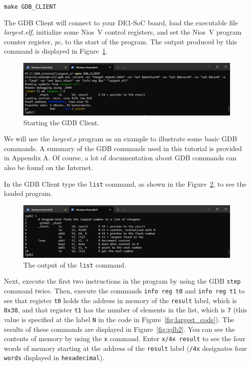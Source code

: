 \documentclass[11pt, twoside, pdftex]{article}
\begin{document}
\texttt{make GDB\_CLIENT}

The GDB Client will connect to your DE1-SoC board, load the executable file {\it largest.elf},
initialize some Nios~V control registers, and set the Nios~V program counter register, {\it pc},
to the start of the program. The output produced by this command is displayed in 
Figure~\ref{fig:gdb_client}.

\begin{figure}[h]
    \begin{center}
        \includegraphics[scale=.6]{figures/gdb_client.png}
        \caption{Starting the GDB Client.}
        \label{fig:gdb_client}
    \end{center}
\end{figure}

We will use the {\it largest.s} program as an example to illustrate some basic GDB commands. 
A summary of the GDB commands used in this tutorial is provided in Appendix A. Of course, a 
lot of documentation about GDB commands can also be found on the Internet. 

In the GDB Client type the \texttt{list} command, as shown in the 
Figure~\ref{fig:gdb1}, to see the loaded program.

\begin{figure}[h]
    \begin{center}
        \includegraphics[scale=.6]{figures/gdb1.png}
        \caption{The output of the \texttt{list} command.}
        \label{fig:gdb1}
    \end{center}
\end{figure}

Next, execute the first two instructions in the program by using the 
GDB \texttt{step} command twice. Then, execute the commands 
\texttt{info reg t0} and \texttt{info reg t1} to see that register \texttt{t0} 
holds the address in memory of the \texttt{result} label, which is \texttt{0x38}, and that
register \texttt{t1} has the number of elements in the list, which is \texttt{7} (this value is
specified at the label \texttt{N} in the code in Figure~\ref{fig:largest_code}).
The results of these commands are displayed in Figure~\ref{fig:gdb2}. You can see the
contents of memory by using the \texttt{x} command. Enter \texttt{x/4x result} to see the
four words of memory starting at the address of the \texttt{result} label (\texttt{/4x}
designates four \texttt{words} displayed in \texttt{hexadecimal}).
\end{document}

